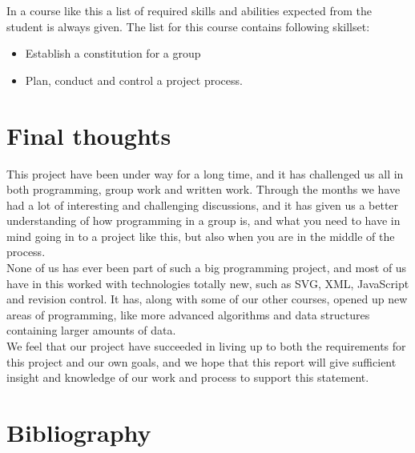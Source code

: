 \documentclass[a4paper,10pt,titlepage]{article}
\begin{document}
In a course like this a list of required skills and abilities expected from the student is always given. The list for this course contains following skillset:
\begin{itemize}
	\item Establish a constitution for a group
	\item Plan, conduct and control a project process.
	 
	
\end{itemize} 

	\newpage
	
	\section{Final thoughts}
	This project have been under way for a long time, and it has challenged us all in both programming, group work and written work. Through the months we have had a lot of interesting and challenging discussions, and it has given us a better understanding of how programming in a group is, and what you need to have in mind going in to a project like this, but also when you are in the middle of the process.\\

None of us has ever been part of such a big programming project, and most of us have in this worked with technologies totally new, such as SVG, XML, JavaScript and revision control. It has, along with some of our other courses, opened up new areas of programming, like more advanced algorithms and data structures containing larger amounts of data.\\

We feel that our project have succeeded in living up to both the requirements for this project and our own goals, and we hope that this report will give sufficient insight and knowledge of our work and process to support this statement.\\
	
	\newpage	
	
	\section{Bibliography}
	
\end{document}
